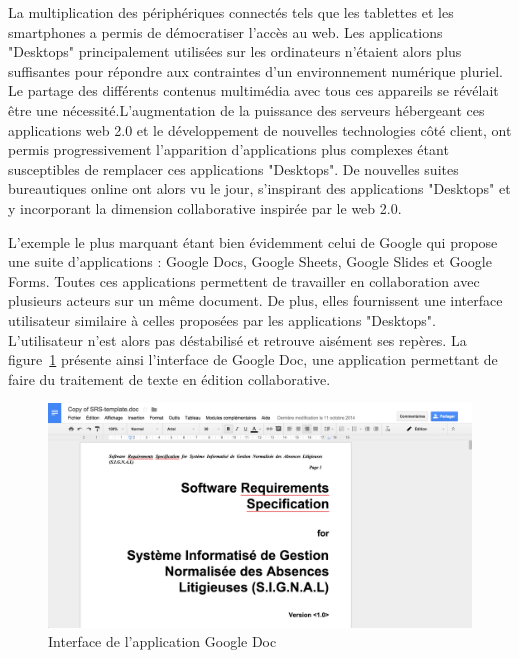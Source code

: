 \documentclass{tnreport}
\begin{document}
La multiplication des périphériques connectés tels que les tablettes et les smartphones a permis de démocratiser l'accès au web. 
Les applications "Desktops" principalement utilisées sur les ordinateurs n'étaient alors plus suffisantes pour répondre aux contraintes
d'un environnement numérique pluriel. Le partage des différents contenus multimédia avec tous ces appareils se révélait être une 
nécessité.L'augmentation de la puissance des serveurs hébergeant ces applications web 2.0 et le développement de nouvelles technologies côté client, ont permis progressivement l'apparition d'applications plus complexes étant susceptibles de remplacer ces applications "Desktops". De nouvelles suites bureautiques online ont alors vu le jour, s'inspirant des applications "Desktops" et y incorporant la dimension collaborative inspirée par le web 2.0. 

L'exemple le plus marquant étant bien évidemment celui de Google qui propose une suite d'applications : Google Docs, Google Sheets, 
Google Slides et Google Forms. Toutes ces applications permettent de travailler en collaboration avec plusieurs acteurs sur un même 
document. De plus, elles fournissent une interface utilisateur similaire à celles proposées par les applications "Desktops". 
L'utilisateur n'est alors pas déstabilisé et retrouve aisément ses repères. La figure~\ref{fig:g-doc} présente ainsi l'interface de 
Google Doc, une application permettant de faire du traitement de texte en édition collaborative.


\begin{figure}[h]
  \centering
  \includegraphics[width=15cm]{figures/gdoc}
  \caption{Interface de l'application Google Doc}
  \label{fig:g-doc}
\end{figure}
\end{document}
